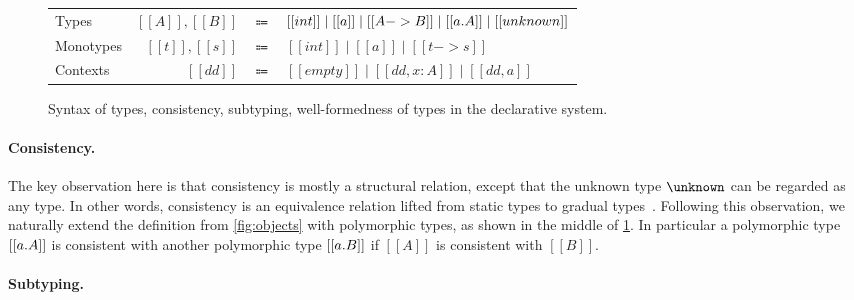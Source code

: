 \begin{figure}[t]
  \centering
  \begin{small}
    \begin{tabular}{lrcl} \toprule
      Types & $[[A]], [[B]]$ & $\Coloneqq$ & $[[int]] \mid [[a]] \mid [[A -> B]] \mid [[\/ a. A]] \mid [[unknown]]$ \\
      Monotypes & $[[t]], [[s]]$ & $\Coloneqq$ & $ [[int]] \mid [[a]] \mid [[t -> s]] $ \\
      Contexts & $[[dd]]$ & $\Coloneqq$ & $ [[empty]]  \mid [[dd , x : A]]  \mid [[dd, a]]$ \\
      \bottomrule
    \end{tabular}

\renewcommand\ottaltinferrule[4]{
  \inferrule*
    {#3}
    {#4}
}


\renewcommand\ottaltinferrule[4]{
  \inferrule*[right=\scriptsize{#1}]
    {#3}
    {#4}
}

\renewcommand\ottaltinferrule[4]{
  \inferrule*
    {#3}
    {#4}
}

  \end{small}
  \caption{Syntax of types, consistency, subtyping, well-formedness of types in the declarative system.}
  \label{fig:decl:subtyping}
\end{figure}

\paragraph{Consistency.}
The key observation here is that consistency is mostly a structural relation,
except that the unknown type $\unknown$ can be regarded as any type. In other
words, consistency is an equivalence relation lifted from static types to
gradual types~\citep{garcia2016abstracting}. Following this observation, we
naturally extend the definition from \cref{fig:objects} with polymorphic types,
as shown in the middle of \cref{fig:decl:subtyping}. In particular a polymorphic
type $[[ \/a . A]]$ is consistent with another polymorphic type $[[ \/a. B ]]$
if $[[A]]$ is consistent with $[[B]]$.

\paragraph{Subtyping.}

